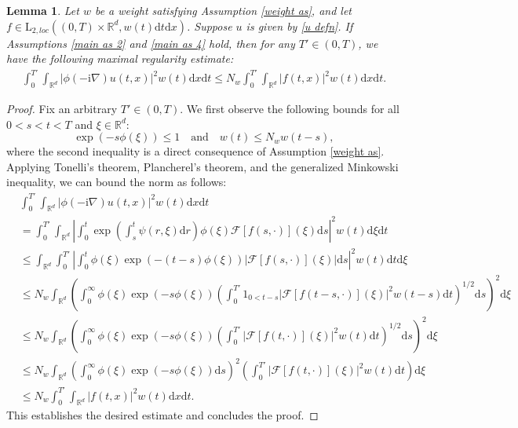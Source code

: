 \documentclass[11pt,reqno]{amsart}
\newtheorem{lem}[thm]{Lemma}
\theoremstyle{definition}
\theoremstyle{remark}
\newcommand\bR{\mathbb{R}}
\newcommand\cF{\mathcal{F}}
\numberwithin{equation}{section}
\begin{document}
\begin{lem}
							\label{l2 bounded lemma}
Let $w$ be a weight satisfying Assumption \ref{weight as}, and let $f \in \mathrm{L}_{2,loc}\left( (0,T) \times \bR^d, w(t)\mathrm{d}t\mathrm{d}x \right)$. Suppose $u$ is given by \eqref{u defn}. If Assumptions \ref{main as 2} and \ref{main as 4} hold, then for any $T' \in (0,T)$, we have the following maximal regularity estimate:
\begin{align}
									\label{maximal regularity estimate}
\int_0^{T'} \int_{\bR^d} \left|\phi(-\mathrm{i}\nabla)u(t,x)\right|^2 w(t) \mathrm{d}x\mathrm{d}t \leq  N_w \int_0^{T'} \int_{\bR^d}|f(t,x)|^2 w(t) \mathrm{d}x\mathrm{d}t.
\end{align}
\end{lem}
\begin{proof}
Fix an arbitrary $T' \in (0,T)$. We first observe the following bounds for all $0<s<t<T$ and $\xi \in \bR^d$:
$$
\exp\left( -s\phi(\xi) \right) \leq 1 \quad \text{and} \quad w(t) \leq N_w w(t-s),
$$
where the second inequality is a direct consequence of Assumption \ref{weight as}.
Applying Tonelli's theorem, Plancherel's theorem, and the generalized Minkowski inequality, we can bound the norm as follows:
\begin{align*}
&\int_0^{T'} \int_{\bR^d} \left|\phi(-\mathrm{i}\nabla)u(t,x)\right|^2 w(t) \mathrm{d}x\mathrm{d}t \\
&= \int_0^{T'} \int_{\bR^d} \left|\int_0^t \exp\left( \int_s^t\psi(r,\xi) \mathrm{d}r \right) \phi(\xi) \cF[f(s,\cdot)](\xi) \mathrm{d}s\right|^2  w(t)\mathrm{d}\xi \mathrm{d}t \\
&\leq \int_{\bR^d} \int_0^{T'}  \left|\int_0^t \phi(\xi) \exp\left( -(t-s) \phi(\xi) \right)  |\cF[f(s,\cdot)](\xi)| \mathrm{d}s\right|^2 w(t) \mathrm{d}t \mathrm{d}\xi \\
&\leq N_w \int_{\bR^d}   \left(\int^\infty_{0}  \phi(\xi) \exp\left( -s \phi(\xi) \right) \left(\int_{0}^{T'}  1_{0<t-s}|\cF[f(t-s,\cdot)](\xi)|^2 w(t-s) \mathrm{d}t\right)^{1/2} \mathrm{d}s \right)^2 \mathrm{d}\xi \\
&\leq N_w \int_{\bR^d}   \left(\int^\infty_{0}  \phi(\xi) \exp\left( -s \phi(\xi) \right) \left(\int_{0}^{T'} |\cF[f(t,\cdot)](\xi)|^2 w(t) \mathrm{d}t\right)^{1/2} \mathrm{d}s \right)^2 \mathrm{d}\xi  \\
&\leq N_w \int_{\bR^d}   \left(\int^\infty_{0}  \phi(\xi) \exp\left( -s \phi(\xi) \right)  \mathrm{d}s \right)^2 
\left(\int_{0}^{T'}  |\cF[f(t,\cdot)](\xi)|^2 w(t) \mathrm{d}t \right) \mathrm{d}\xi \\
&\leq N_w \int_0^{T'}\int_{\bR^d}|f(t,x)|^2  w(t)  \mathrm{d}x \mathrm{d}t.
\end{align*}
This establishes the desired estimate and concludes the proof.
\end{proof}
\end{document}
